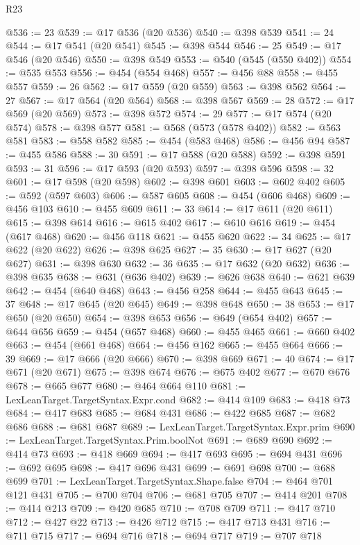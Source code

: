 \begin{lexlean}{R23}
\begin{coremodule}
@536 := 23
@539 := @17 @536 (@20 @536)
@540 := @398 @539
@541 := 24
@544 := @17 @541 (@20 @541)
@545 := @398 @544
@546 := 25
@549 := @17 @546 (@20 @546)
@550 := @398 @549
@553 := @540 (@545 (@550 @402))
@554 := @535 @553
@556 := @454 (@554 @468)
@557 := @456 @88
@558 := @455 @557
@559 := 26
@562 := @17 @559 (@20 @559)
@563 := @398 @562
@564 := 27
@567 := @17 @564 (@20 @564)
@568 := @398 @567
@569 := 28
@572 := @17 @569 (@20 @569)
@573 := @398 @572
@574 := 29
@577 := @17 @574 (@20 @574)
@578 := @398 @577
@581 := @568 (@573 (@578 @402))
@582 := @563 @581
@583 := @558 @582
@585 := @454 (@583 @468)
@586 := @456 @94
@587 := @455 @586
@588 := 30
@591 := @17 @588 (@20 @588)
@592 := @398 @591
@593 := 31
@596 := @17 @593 (@20 @593)
@597 := @398 @596
@598 := 32
@601 := @17 @598 (@20 @598)
@602 := @398 @601
@603 := @602 @402
@605 := @592 (@597 @603)
@606 := @587 @605
@608 := @454 (@606 @468)
@609 := @456 @103
@610 := @455 @609
@611 := 33
@614 := @17 @611 (@20 @611)
@615 := @398 @614
@616 := @615 @402
@617 := @610 @616
@619 := @454 (@617 @468)
@620 := @456 @118
@621 := @455 @620
@622 := 34
@625 := @17 @622 (@20 @622)
@626 := @398 @625
@627 := 35
@630 := @17 @627 (@20 @627)
@631 := @398 @630
@632 := 36
@635 := @17 @632 (@20 @632)
@636 := @398 @635
@638 := @631 (@636 @402)
@639 := @626 @638
@640 := @621 @639
@642 := @454 (@640 @468)
@643 := @456 @258
@644 := @455 @643
@645 := 37
@648 := @17 @645 (@20 @645)
@649 := @398 @648
@650 := 38
@653 := @17 @650 (@20 @650)
@654 := @398 @653
@656 := @649 (@654 @402)
@657 := @644 @656
@659 := @454 (@657 @468)
@660 := @455 @465
@661 := @660 @402
@663 := @454 (@661 @468)
@664 := @456 @162
@665 := @455 @664
@666 := 39
@669 := @17 @666 (@20 @666)
@670 := @398 @669
@671 := 40
@674 := @17 @671 (@20 @671)
@675 := @398 @674
@676 := @675 @402
@677 := @670 @676
@678 := @665 @677
@680 := @464 @664 @110
@681 := LexLeanTarget.TargetSyntax.Expr.cond
@682 := @414 @109
@683 := @418 @73
@684 := @417 @683
@685 := @684 @431
@686 := @422 @685
@687 := @682 @686
@688 := @681 @687
@689 := LexLeanTarget.TargetSyntax.Expr.prim
@690 := LexLeanTarget.TargetSyntax.Prim.boolNot
@691 := @689 @690
@692 := @414 @73
@693 := @418 @669
@694 := @417 @693
@695 := @694 @431
@696 := @692 @695
@698 := @417 @696 @431
@699 := @691 @698
@700 := @688 @699
@701 := LexLeanTarget.TargetSyntax.Shape.false
@704 := @464 @701 @121 @431
@705 := @700 @704
@706 := @681 @705
@707 := @414 @201
@708 := @414 @213
@709 := @420 @685
@710 := @708 @709
@711 := @417 @710
@712 := @427 @22
@713 := @426 @712
@715 := @417 @713 @431
@716 := @711 @715
@717 := @694 @716
@718 := @694 @717
@719 := @707 @718

\end{coremodule}
\end{lexlean}
